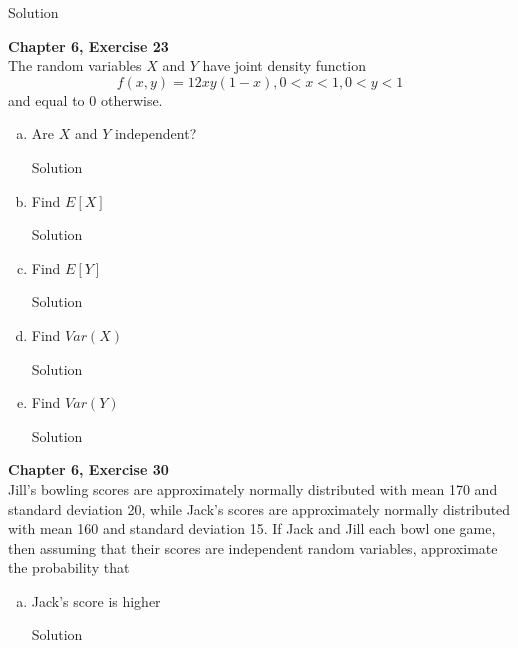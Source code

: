 \documentclass{article}
\begin{document}
\begin{spacing}{1.1}
\begin{homeworkProblem}
\begin{enumerate}[(a)]
\begin{homeworkSection}{Solution}
      \end{homeworkSection}
  \end{enumerate}
\end{homeworkProblem}

\newpage
\begin{homeworkProblem}
  {\bf Chapter 6, Exercise 23}\\
  The random variables $X$ and $Y$ have joint density function
  \[f( x, y) = 12 x y (1 - x), 0 < x < 1, 0 < y < 1\]
  and equal to 0 otherwise.
  \begin{enumerate}[(a)]
    \item Are $X$ and $Y$ independent?
      \begin{homeworkSection}{Solution}
        
      \end{homeworkSection}
    \item Find $E[ X]$
      \begin{homeworkSection}{Solution}
        
      \end{homeworkSection}
    \item Find $E[ Y]$
      \begin{homeworkSection}{Solution}
        
      \end{homeworkSection}
    \item Find $Var( X)$
      \begin{homeworkSection}{Solution}
        
      \end{homeworkSection}
    \item Find $Var( Y)$
      \begin{homeworkSection}{Solution}
        
      \end{homeworkSection}
  \end{enumerate}
\end{homeworkProblem}

\newpage
\begin{homeworkProblem}
  {\bf Chapter 6, Exercise 30}\\
  Jill's bowling scores are approximately normally distributed with 
  mean 170 and standard deviation 20, while Jack's scores are 
  approximately normally distributed with mean 160 and standard 
  deviation 15. If Jack and Jill each bowl one game, then assuming 
  that their scores are independent random variables, approximate 
  the probability that
  \begin{enumerate}[(a)]
    \item Jack's score is higher
      \begin{homeworkSection}{Solution}
        

\end{homeworkSection}
\end{enumerate}
\end{homeworkProblem}
\end{spacing}
\end{document}
